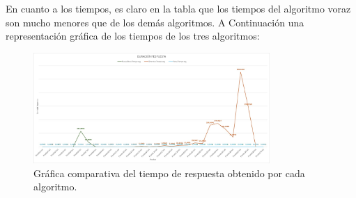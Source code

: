 \documentclass[11pt,letter]{article}
\begin{document}
    En cuanto a los tiempos, es claro en la tabla que los tiempos del algoritmo voraz son mucho menores que de los demás algoritmos. A Continuación una representación gráfica de los tiempos de los tres algoritmos:

    \begin{figure}[H]
        \centering
        \includegraphics[width=0.8\textwidth]{resources/tiempo1.jpeg}
        \caption{Gráfica comparativa del tiempo de respuesta obtenido por cada algoritmo.}
    \end{figure}
\end{document}
